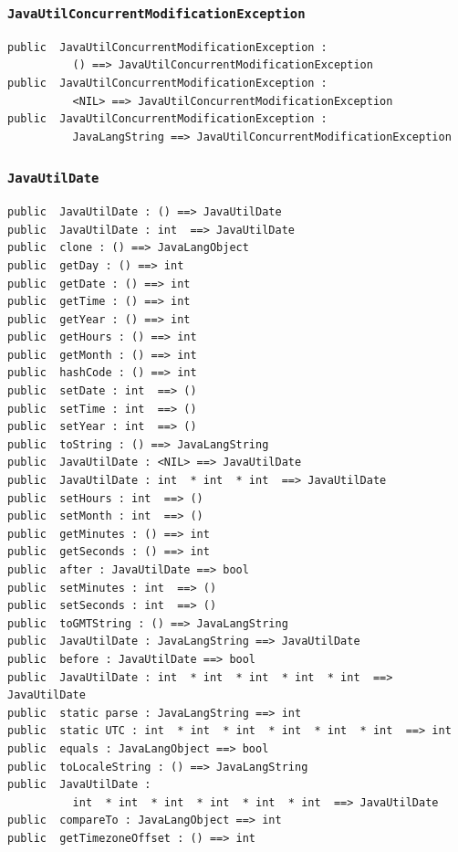 \documentclass[\pformat,12pt]{article}
\begin{document}
\subsubsection{\texttt{JavaUtilConcurrentModificationException}}
\begin{small}
\begin{verbatim}
public  JavaUtilConcurrentModificationException : 
          () ==> JavaUtilConcurrentModificationException
public  JavaUtilConcurrentModificationException : 
          <NIL> ==> JavaUtilConcurrentModificationException
public  JavaUtilConcurrentModificationException : 
          JavaLangString ==> JavaUtilConcurrentModificationException
\end{verbatim}
\end{small}

\subsubsection{\texttt{JavaUtilDate}}
\begin{small}
\begin{verbatim}
public  JavaUtilDate : () ==> JavaUtilDate
public  JavaUtilDate : int  ==> JavaUtilDate
public  clone : () ==> JavaLangObject
public  getDay : () ==> int
public  getDate : () ==> int
public  getTime : () ==> int
public  getYear : () ==> int
public  getHours : () ==> int
public  getMonth : () ==> int
public  hashCode : () ==> int
public  setDate : int  ==> ()
public  setTime : int  ==> ()
public  setYear : int  ==> ()
public  toString : () ==> JavaLangString
public  JavaUtilDate : <NIL> ==> JavaUtilDate
public  JavaUtilDate : int  * int  * int  ==> JavaUtilDate
public  setHours : int  ==> ()
public  setMonth : int  ==> ()
public  getMinutes : () ==> int
public  getSeconds : () ==> int
public  after : JavaUtilDate ==> bool
public  setMinutes : int  ==> ()
public  setSeconds : int  ==> ()
public  toGMTString : () ==> JavaLangString
public  JavaUtilDate : JavaLangString ==> JavaUtilDate
public  before : JavaUtilDate ==> bool
public  JavaUtilDate : int  * int  * int  * int  * int  ==> JavaUtilDate
public  static parse : JavaLangString ==> int
public  static UTC : int  * int  * int  * int  * int  * int  ==> int
public  equals : JavaLangObject ==> bool
public  toLocaleString : () ==> JavaLangString
public  JavaUtilDate : 
          int  * int  * int  * int  * int  * int  ==> JavaUtilDate
public  compareTo : JavaLangObject ==> int
public  getTimezoneOffset : () ==> int
\end{verbatim}
\end{small}
\end{document}
